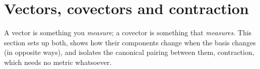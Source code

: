 \section{Vectors, covectors and contraction}\label{sec:vectors}

A vector is something you \emph{measure}; a covector is something that \emph{measures}. This section sets up both,
shows how their components change when the basis changes (in opposite ways), and isolates the canonical pairing
between them, contraction, which needs no metric whatsoever.



